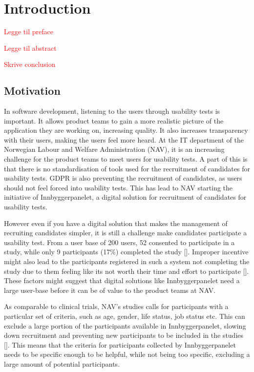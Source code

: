 \section{Introduction}

\textcolor{red}{Legge til preface}

\textcolor{red}{Legge til abstract}

\textcolor{red}{Skrive conclusion}

\subsection{Motivation}
In software development, listening to the users through usability tests is important. It allows product teams to gain a more realistic picture of the application they are working on, increasing quality. It also increases transparency with their users, making the users feel more heard. At the IT department of the Norwegian Labour and Welfare Administration (NAV), it is an increasing challenge for the product teams to meet users for usability tests. A part of this is that there is no standardisation of tools used for the recruitment of candidates for usability tests. GDPR is also preventing the recruitment of candidates, as users should not feel forced into usability tests. This has lead to NAV starting the initiative of Innbyggerpanelet, a digital solution for recruitment of candidates for usability tests.

However even if you have a digital solution that makes the management of recruiting candidates simpler, it is still a challenge make candidates participate a usability test. From a user base of 200 users, 52 consented to participate in a study, while only 9 participants (17\%) completed the study [\cite{pkf_2018}]. Improper incentive might also lead to the participants registered in such a system not completing the study due to them feeling like its not worth their time and effort to participate [\cite{pkf_2018}]. These factors might suggest that digital solutions like Innbyggerpanelet need a large user-base before it can be of value to the product teams at NAV.

As comparable to clinical trials, NAV's studies calls for participants with a particular set of criteria, such as age, gender, life status, job status etc. This can exclude a large portion of the participants available in Innbyggerpanelet, slowing down recruitment and preventing new participants to be included in the studies [\cite{nc_2020}]. This means that the criteria for participants collected by Innbyggerpanelet needs to be specific enough to be helpful, while not being too specific, excluding a large amount of potential participants.

